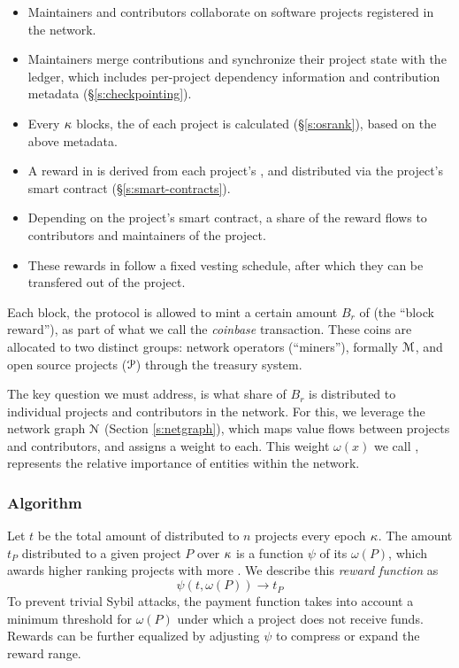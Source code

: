 \begin{itemize}
    \item Maintainers and contributors collaborate on software projects
        registered in the network.
    \item Maintainers merge contributions and synchronize their project state
        with the ledger, which includes per-project dependency information and
        contribution metadata (\S\ref{s:checkpointing}).
    \item Every $\kappa$ blocks, the \osrank{} of each project is calculated
        (\S\ref{s:osrank}), based on the above metadata.
    \item A reward in \oscoin{} is derived from each project's \osrank{},
        and distributed via the project's smart contract (\S\ref{s:smart-contracts}).
    \item Depending on the project's smart contract, a share of the reward flows
        to contributors and maintainers of the project.
    \item These rewards in \oscoin{} follow a fixed vesting schedule, after which
        they can be transfered out of the project.
\end{itemize}

\medskip

\noindent Each block, the protocol is allowed to mint a certain amount $B_r$ of \oscoin{}
(the ``block reward''), as part of what we call the \emph{coinbase}
transaction. These coins are allocated to two distinct groups: network
operators (``miners''), formally $\mathcal{M}$, and open source projects ($\mathcal{P}$)
through the treasury system.

The key question we must address, is what share of $B_r$ is distributed to
individual projects and contributors in the network.
For this, we leverage the \oscoin{} network graph $\mathcal{N}$ (Section
\ref{s:netgraph}), which maps value flows between projects and contributors,
and assigns a weight to each. This weight $\omega(x)$ we call \osrank{}, represents
the relative importance of entities within the network.

\subsubsection{Algorithm} Let $t$ be the total amount of \oscoin{} distributed
to $n$ projects every epoch $\kappa$. The amount $t_P$ distributed to a given
project $P$ over $\kappa$ is a function $\psi$ of its \osrank{} $\omega(P)$,
which awards higher ranking projects with more \oscoin{}. We describe this
\emph{reward function} as
\[
    \psi(t, \omega(P)) \to t_P
\]
To prevent trivial Sybil attacks, the payment function takes
into account a minimum threshold for $\omega(P)$ under which a project does not
receive funds. Rewards can be further equalized by adjusting $\psi$ to
compress or expand the reward range.

